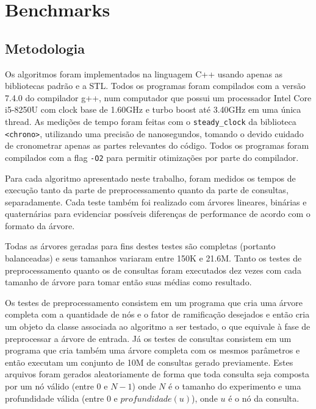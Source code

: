 
\chapter{Benchmarks}
\label{chap:benchmarks}

\section{Metodologia}
Os algoritmos foram implementados na linguagem C++ usando apenas as bibliotecas
padrão e a STL. Todos os programas foram compilados com a versão 7.4.0 do
compilador g++, num computador que possui um processador Intel Core i5-8250U
com clock base de 1.60GHz e turbo boost até 3.40GHz em uma única thread. As medições
de tempo foram feitas com o \texttt{steady\_clock} da biblioteca \texttt{<chrono>},
utilizando uma precisão de nanosegundos, tomando o devido cuidado de cronometrar apenas
as partes relevantes do código. Todos os programas foram compilados com a flag
\texttt{-O2} para permitir otimizações por parte do compilador.

Para cada algoritmo apresentado neste trabalho, foram medidos os tempos de execução tanto
da parte de preprocessamento quanto da parte de consultas, separadamente. Cada teste
também foi realizado com árvores lineares, binárias e quaternárias para evidenciar 
possíveis diferenças de performance de acordo com o formato da árvore.

Todas as árvores geradas para fins destes testes são completas (portanto balanceadas) 
e seus tamanhos variaram entre 150K e 21.6M. Tanto os testes de preprocessamento quanto
os de consultas foram executados dez vezes com cada tamanho de árvore para tomar então
suas médias como resultado. 

Os testes de preprocessamento consistem em um programa que cria uma árvore completa
com a quantidade de nós e o fator de ramificação desejados e então cria um objeto da
classe associada ao algoritmo a ser testado, o que equivale à fase de preprocessar a
árvore de entrada. Já os testes de consultas consistem em um programa que cria também
uma árvore completa com os mesmos parâmetros e então executam um conjunto de 10M de
consultas gerado previamente. Estes arquivos foram gerados aleatoriamente de forma que
toda consulta seja composta por um nó válido (entre 0 e $N-1$) onde $N$ é o tamanho do
experimento e uma profundidade válida (entre 0 e $profundidade(u)$), onde $u$ é o nó
da consulta.

